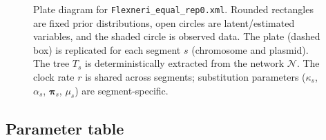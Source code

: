 \documentclass[11pt]{article}
\begin{document}
\begin{figure}[H]
\caption{Plate diagram for \texttt{Flexneri\_equal\_rep0.xml}. Rounded rectangles are fixed prior distributions, open circles are latent/estimated variables, and the shaded circle is observed data. The plate (dashed box) is replicated for each segment $s$ (chromosome and plasmid). The tree $T_s$ is deterministically extracted from the network $\mathcal{N}$. The clock rate $r$ is shared across segments; substitution parameters ($\kappa_s$, $\alpha_s$, $\boldsymbol{\pi}_s$, $\mu_s$) are segment-specific.}
\label{fig:plate-flexneri}
\end{figure}

\subsection{Parameter table}
\end{document}
